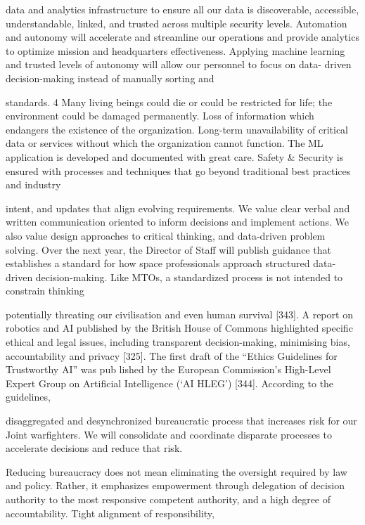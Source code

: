 \documentclass[a4paper,12pt]{article}
\begin{document}
data and analytics infrastructure to ensure all our data is 
discoverable, accessible, understandable, linked, and 
trusted across multiple security levels.  
Automation 
and 
autonomy 
will 
accelerate 
and 
streamline our operations and provide analytics to 
optimize mission and headquarters effectiveness. 
Applying machine learning and trusted levels of 
autonomy will allow our personnel to focus on data-
driven decision-making instead of manually sorting and

standards. 
4 
Many living beings could die or 
could be restricted for life; the 
environment could be damaged 
permanently. Loss of 
information which endangers 
the existence of the 
organization. Long-term 
unavailability of critical data or 
services without which the 
organization cannot function. 
The ML application is 
developed and documented 
with great care. Safety & 
Security is ensured with 
processes and techniques that 
go beyond traditional best 
practices and industry

intent, and updates that align evolving requirements.  We 
value clear verbal and written communication oriented to 
inform decisions and implement actions. 
We also value design approaches to critical thinking, and 
data-driven problem solving. Over the next year, the 
Director of Staff will publish guidance that establishes a 
standard 
for 
how 
space 
professionals 
approach 
structured data-driven decision-making. Like MTOs, a 
standardized process is not intended to constrain thinking

potentially threating our civilisation and even human survival [343]. A 
report on robotics and AI published by the British House of Commons 
highlighted specific ethical and legal issues, including transparent 
decision-making, minimising bias, accountability and privacy [325]. 
The first draft of the “Ethics Guidelines for Trustworthy AI” was pub­
lished by the European Commission’s High-Level Expert Group on 
Artificial Intelligence (‘AI HLEG’) [344]. According to the guidelines,

disaggregated and desynchronized bureaucratic process 
that increases risk for our Joint warfighters. We will 
consolidate and coordinate disparate processes to 
accelerate decisions and reduce that risk. 
 
Reducing bureaucracy does not mean eliminating the 
oversight required by law and policy. Rather, it emphasizes 
empowerment through delegation of decision authority to 
the most responsive competent authority, and a high 
degree of accountability. Tight alignment of responsibility,
\end{document}
